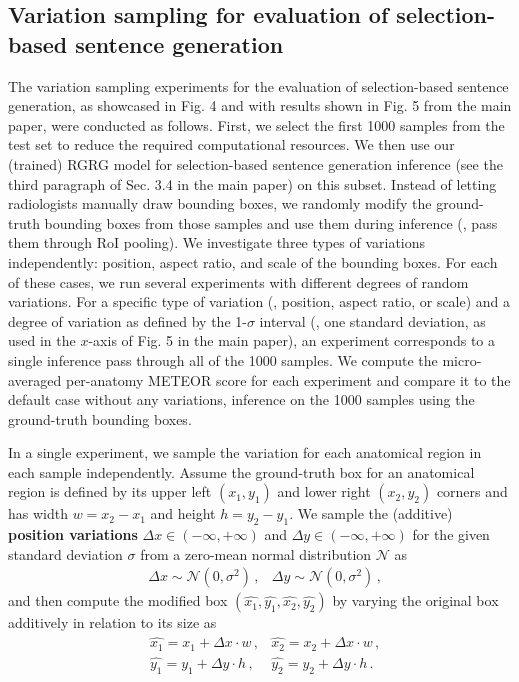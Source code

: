 \documentclass[10pt,twocolumn,letterpaper]{article}
\begin{document}
\subsection{Variation sampling for evaluation of selection-based sentence generation}\label{appendix:variation_sampling}
The variation sampling experiments for the evaluation of selection-based sentence generation, as showcased in Fig. 4 and with results shown in Fig. 5 from the main paper, were conducted as follows.
First, we select the first 1000 samples from the test set to reduce the required computational resources. We then use our (trained) RGRG model for selection-based sentence generation inference (see the third paragraph of Sec. 3.4 in the main paper) on this subset. Instead of letting radiologists manually draw bounding boxes, we randomly modify the ground-truth bounding boxes from those samples and use them during inference (\ie, pass them through RoI pooling). We investigate three types of variations independently: position, aspect ratio, and scale of the bounding boxes. For each of these cases, we run several experiments with different degrees of random variations.
For a specific type of variation (\ie, position, aspect ratio, or scale) and a degree of variation as defined by the 1-$\sigma$ interval (\ie, one standard deviation, as used in the $x$-axis of Fig. 5 in the main paper), an experiment corresponds to a single inference pass through all of the 1000 samples.
 We compute the micro-averaged per-anatomy METEOR score for each experiment and compare it to the default case without any variations, \ie inference on the 1000 samples using the ground-truth bounding boxes.

In a single experiment, we sample the variation for each anatomical region in each sample independently.
Assume the ground-truth box for an anatomical region is defined by its upper left $(x_1, y_1)$ and lower right $(x_2, y_2)$ corners and has width $w = x_2 - x_1$ and height $h = y_2 - y_1$. 
We sample the (additive) \textbf{position variations} $\Delta x \in (-\infty, +\infty)$ and $\Delta y \in (-\infty, +\infty)$ for the given standard deviation $\sigma$ from a zero-mean normal distribution $\mathcal{N}$ as
\begin{align}
    &\Delta x \sim \mathcal{N}(0, \sigma^2) \,, &\Delta y \sim \mathcal{N}(0, \sigma^2) \,,
\end{align}
and then compute the modified box $(\hat{x_1}, \hat{y_1}, \hat{x_2}, \hat{y_2})$ by varying the original box additively in relation to its size as
\begin{equation}
\begin{aligned}
    &\hat{x_1} = x_1 + \Delta x \cdot w\,, &\hat{x_2} = x_2 + \Delta x \cdot w \,,\\
    &\hat{y_1} = y_1 + \Delta y \cdot h\,, &\hat{y_2} = y_2 + \Delta y \cdot h \,.
\end{aligned}
\end{equation}
\end{document}

